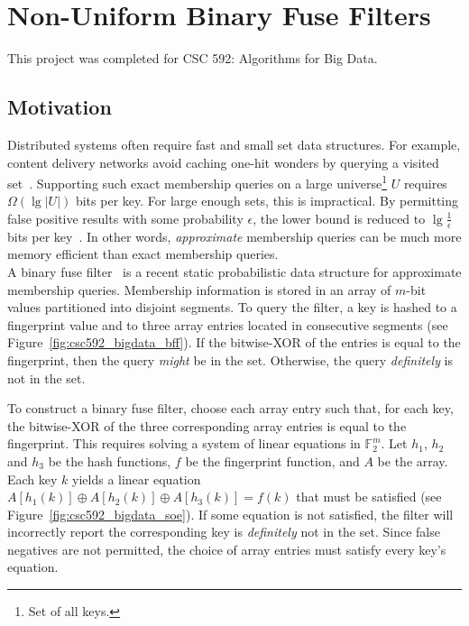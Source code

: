 \section{Non-Uniform Binary Fuse Filters}

This project was completed for CSC 592: Algorithms for Big Data.

\subsection{Motivation}

Distributed systems often require fast and small set data structures. For example, content delivery networks avoid caching one-hit wonders by querying a visited
set~\cite{maggs2015}. Supporting such exact membership queries on a large universe\footnote{Set of all keys.} $U$ requires $\Omega(\lg |U|)$ bits per key. For 
large enough sets, this is impractical. By permitting false positive results with some probability $\epsilon$, the lower bound is reduced to $\lg \frac{1}{\epsilon}$ 
bits per key~\cite{carter1978}. In other words, \textit{approximate} membership queries can be much more memory efficient than exact membership queries. \\

\noindent
A binary fuse filter~\cite{graf2022} is a recent static probabilistic data structure for approximate membership queries. Membership information is stored in an 
array of $m$-bit values partitioned into disjoint segments. To query the filter, a key is hashed to a fingerprint value and to three array entries located in 
consecutive segments (see Figure~\ref{fig:csc592_bigdata_bff}). If the bitwise-XOR of the entries is equal to the fingerprint, then the query \emph{might} be in 
the set. Otherwise, the query \emph{definitely} is not in the set.



\noindent
To construct a binary fuse filter, choose each array entry such that, for each key, the bitwise-XOR of the three corresponding array entries is equal to
the fingerprint. This requires solving a system of linear equations in $\mathbb{F}^{m}_2$. Let $h_1$, $h_2$ and $h_3$ be the hash functions, $f$ be the 
fingerprint function, and $A$ be the array. Each key $k$ yields a linear equation $A[h_1(k)] \oplus A[h_2(k)] \oplus A[h_3(k)] = f(k)$ that must be satisfied 
(see Figure~\ref{fig:csc592_bigdata_soe}). If some equation is not satisfied, the filter will incorrectly report the corresponding key is \emph{definitely} not 
in the set. Since false negatives are not permitted, the choice of array entries must satisfy every key's equation.

